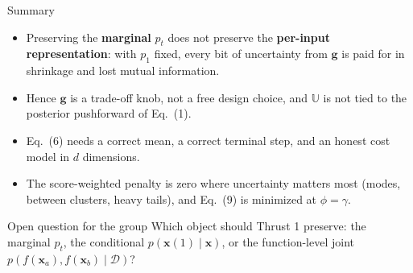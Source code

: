 \documentclass[aspectratio=169,11pt]{beamer}
\newcommand{\U}{\mathbb{U}}
\newcommand{\x}{\bm{x}}
\newcommand{\g}{\bm{g}}
\newcommand{\source}[1]{\par\vfill{\scriptsize\color{ink2}#1}}
\begin{document}
\begin{frame}{Summary}
  \small
  \begin{itemize}
    \item Preserving the \textbf{marginal} $p_t$ does not preserve the \textbf{per-input representation}: with $p_1$ fixed, every bit of uncertainty from $\g$ is paid for in shrinkage and lost mutual information.
    \item Hence $\g$ is a trade-off knob, not a free design choice, and $\U$ is not tied to the posterior pushforward of Eq.~(1).
    \item Eq.~(6) needs a correct mean, a correct terminal step, and an honest cost model in $d$ dimensions.
    \item The score-weighted penalty is zero where uncertainty matters most (modes, between clusters, heavy tails), and Eq.~(9) is minimized at $\phi=\gamma$.
  \end{itemize}
  \smallskip
  \begin{block}{Open question for the group}
    Which object should Thrust 1 preserve: the marginal $p_t$, the conditional $p(\x(1)\mid\x)$, or the function-level joint $p(f(\x_a),f(\x_b)\mid\mathcal D)$?
  \end{block}
\end{frame}

%
\end{document}

